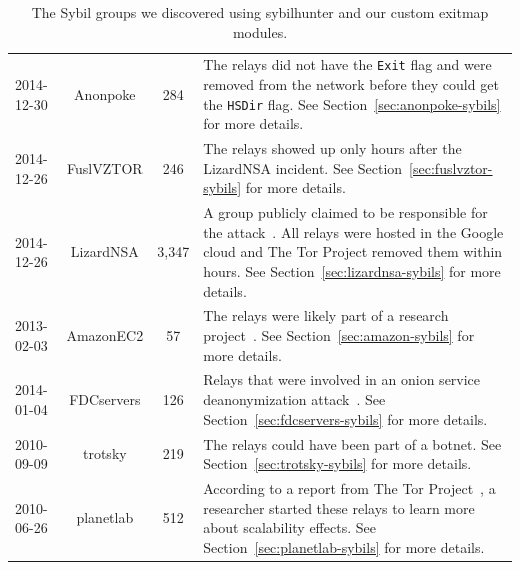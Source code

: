 \begin{table}[t]
\begin{tabular}{l c c p{10cm}}
2014-12-30 & Anonpoke & 284 & The relays did not have the \texttt{Exit} flag and
were removed from the network before they could get the \texttt{HSDir} flag.
See Section~\ref{sec:anonpoke-sybils} for more details. \\

2014-12-26 & FuslVZTOR & 246 & The relays showed up only hours after the
LizardNSA incident.  See Section~\ref{sec:fuslvztor-sybils} for more details. \\

2014-12-26 & LizardNSA & 3,347 & A group publicly claimed to be responsible for
the attack~\cite{lizards}.  All relays were hosted in the Google cloud and The
Tor Project removed them within hours.  See Section~\ref{sec:lizardnsa-sybils}
for more details. \\

2013-02-03 & AmazonEC2 & 57 & The relays were likely part of a research
project~\cite{Biryukov2013a}.  See Section~\ref{sec:amazon-sybils} for more
details. \\

2014-01-04 & FDCservers & 126 & Relays that were involved in an onion service
deanonymization attack~\cite{cmucert}.  See Section~\ref{sec:fdcservers-sybils}
for more details. \\

2010-09-09 & trotsky & 219 & The relays could have been part of a botnet.  See
Section~\ref{sec:trotsky-sybils} for more details. \\

2010-06-26 & planetlab & 512 & According to a report from The Tor
Project~\cite{progressreport}, a researcher started these relays to learn more
about scalability effects.  See Section~\ref{sec:planetlab-sybils} for more
details. \\
\end{tabular}
\caption{The Sybil groups we discovered using sybilhunter and our custom exitmap
modules.}
\label{tab:sybils}
\end{table}

